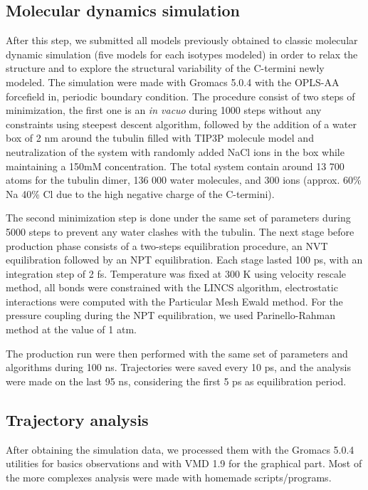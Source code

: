 \documentclass[a4paper]{article}
\begin{document}
\subsection{Molecular dynamics simulation}

After this step, we submitted all models previously obtained to classic molecular dynamic simulation (five
models for each isotypes modeled) in order to relax the structure and to explore the structural variability
of the C-termini newly modeled. The simulation were made with Gromacs 5.0.4 with the OPLS-AA forcefield in,
periodic boundary condition. The procedure consist of two steps of minimization, the first one is an
\textit{in vacuo} during 1000 steps without any constraints using steepest descent algorithm, followed by the addition
of a water box of 2 nm around the tubulin filled with TIP3P molecule model and neutralization of the system
with randomly added NaCl ions in the box while maintaining a 150mM concentration. The total system contain around
13 700 atoms for the tubulin dimer, 136 000 water molecules, and 300 ions (approx. 60\% Na 40\% Cl due to the high
negative charge of the C-termini).

The second minimization step is done under the same set of parameters during 5000 steps to prevent any water
clashes with the tubulin. The next stage before production phase consists of a two-steps equilibration procedure,
an NVT equilibration followed by an NPT equilibration. Each stage lasted 100 ps, with an integration step of 2 fs.
Temperature was fixed at 300 K using velocity rescale method, all bonds were constrained with the LINCS algorithm,
electrostatic interactions were computed with the Particular Mesh Ewald method. For the pressure coupling during
the NPT equilibration, we used Parinello-Rahman method at the value of 1 atm.

The production run were then performed with the same set of parameters and algorithms during 100 ns. Trajectories
were saved every 10 ps, and the analysis were made on the last 95 ns, considering the first 5 ps as equilibration
period.

\subsection{Trajectory analysis}

After obtaining the simulation data, we processed them with the Gromacs 5.0.4 utilities for basics observations and
with VMD 1.9 for the graphical part. Most of the more complexes analysis were made with homemade scripts/programs.
\end{document}
